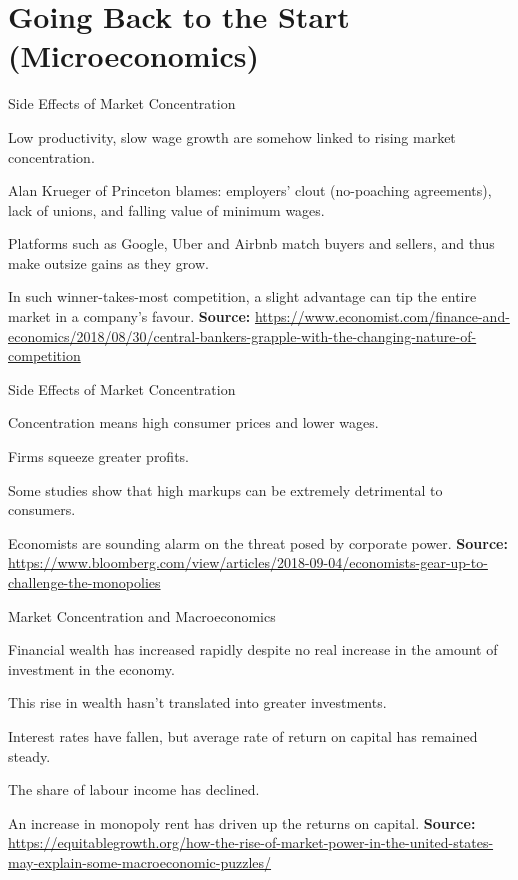 \documentclass[shownotes,11pt, aspectratio=169]{beamer}
\newenvironment{wideitemize}{\itemize\addtolength{\itemsep}{10pt}}{\enditemize}
\begin{document}
\section{Going Back to the Start (Microeconomics)}
\begin{frame}{Side Effects of Market Concentration}
\begin{wideitemize}
\item Low productivity, slow wage growth are somehow linked to rising market concentration.
\item Alan Krueger of Princeton blames: employers' clout (no-poaching agreements), lack of unions, and falling value of minimum wages.
\pause
\item  Platforms such as Google, Uber and Airbnb match buyers and sellers, and thus make outsize gains as they grow. 
\item In such winner-takes-most competition, a slight advantage can tip the entire market in a company's favour.
\end{wideitemize}
\textbf{Source:} \url{https://www.economist.com/finance-and-economics/2018/08/30/central-bankers-grapple-with-the-changing-nature-of-competition}
\end{frame}

\begin{frame}{Side Effects of Market Concentration}
\begin{wideitemize}
\item Concentration means high consumer prices and lower wages.
\item Firms squeeze greater profits.
\item Some studies show that high markups can be extremely detrimental to consumers.
\item Economists are sounding alarm on the threat posed by corporate power.
\end{wideitemize}
\textbf{Source:} \url{https://www.bloomberg.com/view/articles/2018-09-04/economists-gear-up-to-challenge-the-monopolies}
\end{frame}

\begin{frame}{Market Concentration and Macroeconomics}
\begin{wideitemize}
\item Financial wealth has increased rapidly despite no real increase in the amount of investment in the economy.
\item This rise in wealth hasn't translated into greater investments.
\item Interest rates have fallen, but average rate of return on capital has remained steady.
\item The share of labour income has declined. 
\item An increase in monopoly rent has driven up the returns on capital.
\end{wideitemize}
\textbf{Source:} \url{https://equitablegrowth.org/how-the-rise-of-market-power-in-the-united-states-may-explain-some-macroeconomic-puzzles/}
\end{frame}
\end{document}
